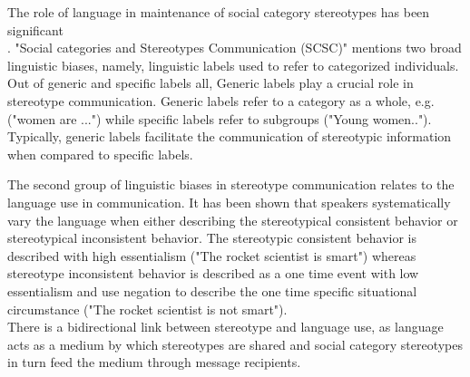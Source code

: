 The role of language in maintenance of social category stereotypes has been significant
\\
\cite{burgers2020language}.
 "Social categories and Stereotypes Communication (SCSC)" 
 \cite{beukeboom2019stereotypes} mentions two broad linguistic biases, namely, linguistic labels used to refer to categorized individuals. Out of generic and specific labels all, Generic labels play a crucial role in stereotype communication\cite{burgers2020language}. Generic labels refer to a category as a whole, e.g.("women are ...") while specific labels refer to subgroups ("Young women.."). Typically, generic labels facilitate the communication of stereotypic information when compared to specific labels\cite{burgers2020language}. 
 
 The second group of linguistic biases in stereotype communication relates to the language use in communication\cite{beukeboom2019stereotypes}. It has been shown that speakers systematically vary the language when either describing the stereotypical consistent behavior or stereotypical inconsistent behavior. The stereotypic consistent behavior is described with high essentialism  ("The rocket scientist is smart") whereas stereotype inconsistent behavior is described as a one time event with low essentialism and use negation to describe the one time specific situational circumstance ("The rocket scientist is not smart")\cite{burgers2020language}.  
 \\
There is a bidirectional link between stereotype and language use, as language acts as a medium by which stereotypes are shared and social category stereotypes in turn feed the medium through message recipients\cite{burgers2020language}. 

